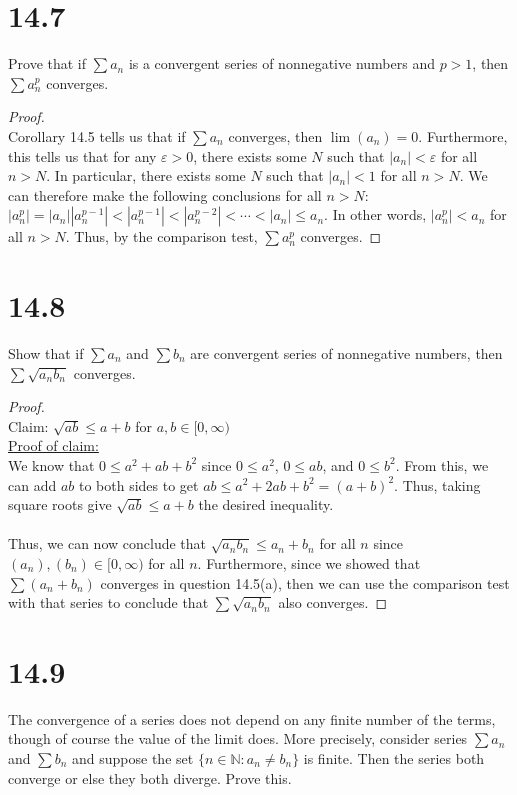 \documentclass[10pt,a4paper]{article}
\theoremstyle{definition}
\begin{document}
\section*{14.7}
Prove that if $\sum a_n$ is a convergent series of nonnegative numbers and $p > 1$, then $\sum a_n^p$ converges. 

\begin{proof}{$ $}
\\Corollary 14.5 tells us that if $\sum a_n$ converges, then $\lim(a_n) = 0$. Furthermore, this tells us that for any $\varepsilon > 0$, there exists some $N$ such that $|a_n| < \varepsilon$ for all $n > N$. In particular, there exists some $N$ such that $|a_n| < 1$ for all $n > N$. We can therefore make the following conclusions for all $n > N$: $|a_n^p| = |a_n||a_n^{p-1}| < |a_n^{p-1}| < |a_n^{p-2}| < \cdots < |a_n| \leq a_n$. In other words, $|a_n^p| < a_n$ for all $n > N$. Thus, by the comparison test, $\sum a_n^p$ converges. 
\end{proof}

\section*{14.8}
Show that if $\sum a_n$ and $\sum b_n$ are convergent series of nonnegative numbers, then $\sum \sqrt{a_n b_n}$ converges.

\begin{proof}{$ $}
\\Claim: $\sqrt{ab} \leq a + b$ for $a, b \in [0,\infty)$
\\\underline{Proof of claim:}
\\We know that $0 \leq a^2 + ab + b^2$ since $0 \leq a^2$, $0 \leq ab$, and $0 \leq b^2$. From this, we can add $ab$ to both sides to get $ab \leq a^2 + 2ab + b^2 = (a + b)^2$. Thus, taking square roots give $\sqrt{ab} \leq a + b$ the desired inequality.
\\
\\Thus, we can now conclude that $\sqrt{a_n b_n} \leq a_n + b_n$ for all $n$ since $(a_n), (b_n) \in [0,\infty)$ for all $n$. Furthermore, since we showed that $\sum (a_n + b_n)$ converges in question 14.5(a), then we can use the comparison test with that series to conclude that $\sum \sqrt{a_n b_n}$ also converges. 
\end{proof}

\section*{14.9}
The convergence of a series does not depend on any finite number of the terms, though of course the value of the limit does. More precisely, consider series $\sum a_n$ and $\sum b_n$ and suppose the set $\{n \in \mathbb{N} : a_n \neq b_n\}$ is finite. Then the series both converge or else they both diverge. Prove this.
\end{document}
